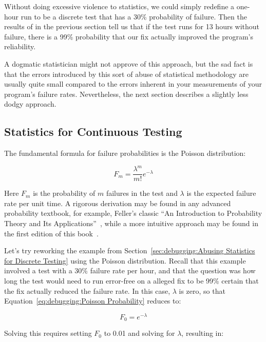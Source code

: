 Without doing excessive violence to statistics, we could simply
redefine a one-hour run to be a discrete test that has a 30\%
probability of failure.
Then the results of in the previous section tell us that if the test
runs for 13 hours without failure, there is a 99\% probability that
our fix actually improved the program's reliability.

A dogmatic statistician might not approve of this approach, but the
sad fact is that the errors introduced by this sort of abuse of
statistical methodology are usually quite small compared to the
errors inherent in your measurements of your program's failure rates.
Nevertheless, the next section describes a slightly less dodgy approach.

\subsection{Statistics for Continuous Testing}
\label{sec:debuggingStatistics for Continuous Testing}

The fundamental formula for failure probabilities is the Poisson
distribution:

\begin{equation}
	F_m = \frac{\lambda^m}{m!} e^{-\lambda}
\label{eq:debugging:Poisson Probability}
\end{equation}

Here $F_m$ is the probability of $m$ failures in the test and
$\lambda$ is the expected failure rate per unit time.
A rigorous derivation may be found in any advanced probability
textbook, for example, Feller's classic ``An Introduction to Probability
Theory and Its Applications''~\cite{Feller58}, while a more
intuitive approach may be found in the first edition of
this book~\cite{McKenney2014ParallelProgramming-e1}.

Let's try reworking the example from
Section~\ref{sec:debugging:Abusing Statistics for Discrete Testing}
using the Poisson distribution.
Recall that this example involved a test with a 30\% failure rate per
hour, and that the question was how long the test would need to run
error-free
on a alleged fix to be 99\% certain that the fix actually reduced the
failure rate.
In this case, $\lambda$ is zero, so that
Equation~\ref{eq:debugging:Poisson Probability} reduces to:

\begin{equation}
	F_0 =  e^{-\lambda}
\end{equation}

Solving this requires setting $F_0$
to 0.01 and solving for $\lambda$, resulting in:

